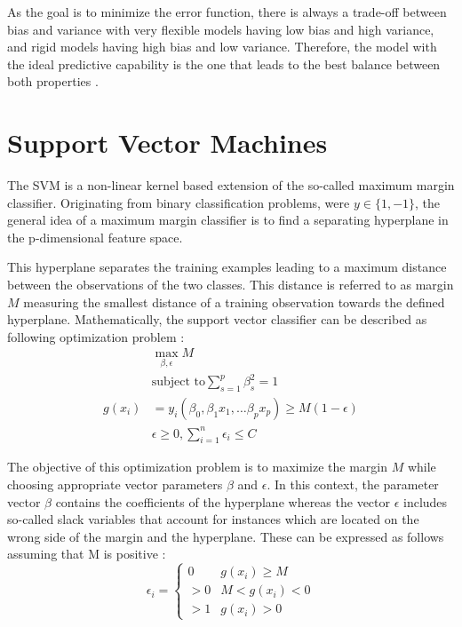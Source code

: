 As the goal is to minimize the error function, there is always a trade-off between bias and variance with very flexible models having low bias and high variance, and rigid models having high bias and low variance. Therefore, the model with the ideal predictive capability is the one that leads to the best balance between both properties \cite{Duda:2000:PC:954544}.

\section{Support Vector Machines}
The SVM is a non-linear kernel based extension of the so-called maximum margin classifier. Originating from binary classification problems, were $y \in \{1, -1\}$, the general idea of a maximum margin classifier is to find a separating hyperplane in the p-dimensional feature space. 

This hyperplane separates the training examples leading to a maximum distance between the observations of the two classes. This distance is referred to as margin $M$ measuring the smallest distance of a training observation towards the defined hyperplane. Mathematically, the support vector classifier can be described as following optimization problem \cite{James:2014:ISL:2517747}:
\begin{eqnarray}
  & \max_{\beta, \epsilon} M \\
  & \textrm{subject to} \sum_{s=1}^{p} \beta^2_s = 1 \\
  g(x_{i}) &= y_i(\beta_0, \beta_1 x_1, \dots \beta_p x_p) \geq M(1 - \epsilon) \\
  & \epsilon \geq 0, \sum_{i=1}^n \epsilon_i \leq C
\end{eqnarray}

The objective of this optimization problem is to maximize the margin $M$ while choosing appropriate vector parameters $\beta$ and $\epsilon$. In this context, the parameter vector $\beta$ contains the coefficients of the hyperplane whereas the vector $\epsilon$ includes so-called slack variables that account for instances which are located on the wrong side of the margin and the hyperplane. These can be expressed as follows assuming that M is positive \cite{James:2014:ISL:2517747}:
\begin{equation}
  \epsilon_i =
  \begin{cases}
    0 & g(x_i) \geq M \\
    > 0 & M < g(x_i) < 0 \\
    > 1 & g(x_i) > 0 
  \end{cases}
\end{equation}

